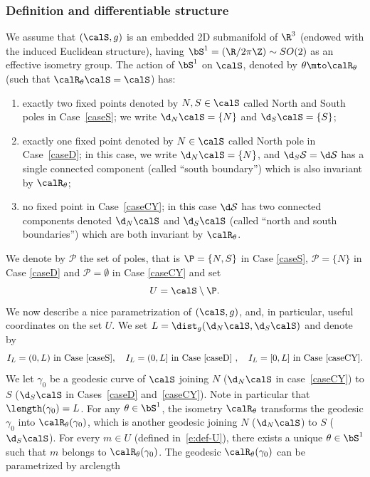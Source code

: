 \subsubsection*{Definition and differentiable structure}
We assume that $(\calS, g)$ is an embedded 2D submanifold of $\R^3$ (endowed with the induced Euclidean structure), having $\bS^1 = (\R/2\pi\Z) \sim SO(2)$ as an effective isometry group.
The action of $\bS^1$ on $\calS$, denoted by $\theta \mto \calR_\theta$ (such that $\calR_\theta \calS = \calS$) has:
\begin{enumerate}
\item exactly two fixed points denoted by $N, S \in \calS$ called North and South poles in Case~\ref{caseS}; we write $\d_N \calS = \{N\}$ and $\d_S \calS = \{S\}$;
\item exactly one fixed point denoted by $N \in \calS$ called North pole in Case~\ref{caseD}; in this case, we write $\d_N \calS = \{N\}$, and $\d_S \mathcal{S} = \d\mathcal{S}$ has a single connected component (called ``south boundary'') which is also invariant by $\calR_\theta$;
\item no fixed point in Case~\ref{caseCY}; in this case $\d\mathcal{S}$ has two connected components denoted $\d_N\calS$ and $\d_S\calS$ (called ``north and south boundaries'') which are both invariant by $\calR_\theta$.
\end{enumerate}
We denote by $\mathcal{P}$ the set of poles, that is $\P=\{N,S\}$ in Case \ref{caseS}, $\mathcal{P}=\{N\}$ in Case \ref{caseD} and $\mathcal{P}=\emptyset$ in Case \ref{caseCY} and set
\begin{equation}
\label{e:def-U}
U =\calS \setminus \P.
\end{equation}
We now describe a nice parametrization of $(\calS, g)$, and, in particular, useful coordinates on the set $U$. We set $L= \dist_g(\d_N \calS, \d_S \calS)$ and denote by
\begin{equation}
\label{e:def-IL}
I_L=(0,L) \text{ in Case \ref{caseS}}, \quad I_L=(0,L] \text{ in Case \ref{caseD} }, \quad I_L=[0,L] \text{ in Case \ref{caseCY}}.
\end{equation}
We let $\gamma_0$ be a geodesic curve of $\calS$ joining $N$ (\resp $\d_N \calS$ in case~\ref{caseCY}) to $S$ (\resp $\d_S \calS$ in Cases~\ref{caseD} and~\ref{caseCY}). Note in particular that $\length(\gamma_0) = L$. For any $\theta \in \bS^1$, the isometry $\calR_\theta$ transforms the geodesic $\gamma_0$ into $\calR_\theta (\gamma_0)$, which is another geodesic joining $N$ (\resp $\d_N \calS$) to $S$ (\resp $\d_S \calS$). For every $m \in U$ (defined in~\eqref{e:def-U}), there exists a unique $\theta \in \bS^1$ such that $m$ belongs to $\calR_\theta (\gamma_0)$. The geodesic $\calR_\theta (\gamma_0)$ can be parametrized by arclength

